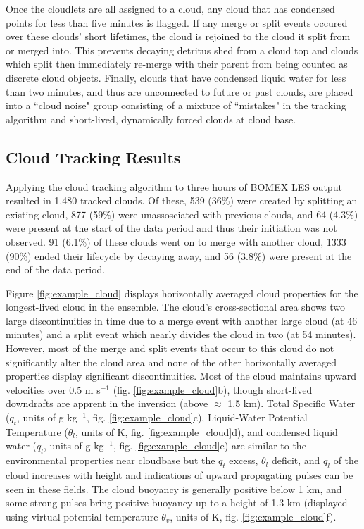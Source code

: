 \documentclass[acp]{copernicus}
\begin{document}
Once the cloudlets are all assigned to a cloud, any cloud that has condensed 
points for less than five minutes is flagged.  If any merge or split events 
occured over these clouds' short lifetimes, the cloud is rejoined to the cloud 
it split from or merged into.  This prevents decaying detritus shed from a 
cloud top and clouds which split then immediately re-merge with their parent 
from being counted as discrete cloud objects.  Finally, clouds that have 
condensed liquid water for less than two minutes, and thus are unconnected to 
future or past clouds, are placed into a ``cloud noise" group consisting of a 
mixture of ``mistakes" in the tracking algorithm and short-lived, dynamically 
forced clouds at cloud base. 

\subsection{Cloud Tracking Results}

Applying the cloud tracking algorithm to three hours of BOMEX LES output 
resulted in 1,480 tracked clouds.  Of these, 539 (36\%) were created by 
splitting an existing cloud, 877 (59\%) were unassosciated with previous 
clouds, and 64 (4.3\%) were present at the start of the data period and thus 
their initiation was not observed.  91 (6.1\%) of these clouds went on to merge 
with another cloud, 1333 (90\%) ended their lifecycle by decaying away, and 
56 (3.8\%) were present at the end of the data period.

Figure \ref{fig:example_cloud} displays horizontally averaged cloud properties 
for the longest-lived cloud in the ensemble.  The cloud's cross-sectional area 
shows two large discontinuities in time due to a merge event with another large 
cloud (at 46 minutes) and a split event which nearly divides the cloud in two 
(at 54 minutes).  However, most of the merge and split events that occur to
this cloud do not significantly alter the cloud area and none of the other 
horizontally averaged properties display significant discontinuities.  Most of 
the cloud maintains upward velocities over 0.5 m s$^{-1}$ (fig. 
\ref{fig:example_cloud}b), though short-lived downdrafts are apprent in the 
inversion (above $\approx$ 1.5 km).  Total Specific Water ($q_t$, units of 
g kg$^{-1}$, fig. \ref{fig:example_cloud}c), Liquid-Water Potential 
Temperature ($\theta_l$, units of K, fig. \ref{fig:example_cloud}d), and 
condensed liquid water ($q_l$, units of g kg$^{-1}$, fig. 
\ref{fig:example_cloud}e) are similar to the environmental properties near 
cloudbase but the $q_t$ excess, $\theta_l$ deficit, and $q_l$ of the cloud 
increases with height and indications of upward propagating pulses can be seen 
in these fields.  The cloud buoyancy is generally positive below 1 km, and some 
strong pulses bring positive buoyancy up to a height of 1.3 km 
(displayed using virtual potential temperature $\theta_v$, units of K, fig. 
\ref{fig:example_cloud}f).
\end{document}

